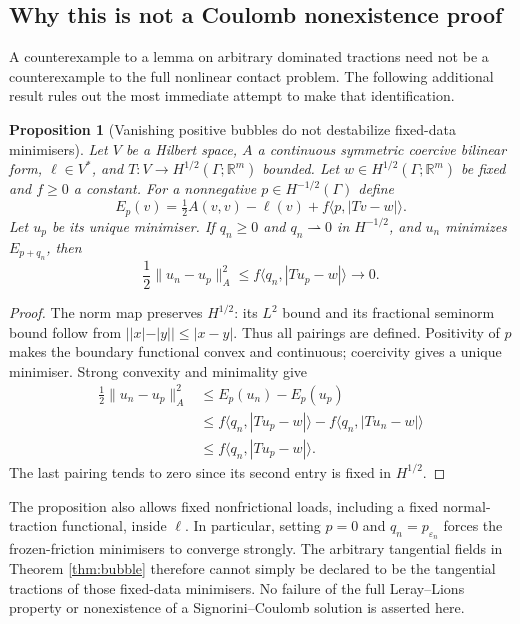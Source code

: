 \documentclass[11pt,a4paper]{article}
\newtheorem{proposition}[theorem]{Proposition}
\theoremstyle{definition}\newtheorem{definition}[theorem]{Definition}
\theoremstyle{remark}\newtheorem{remark}[theorem]{Remark}
\newcommand{\R}{\mathbb R}
\newcommand{\ip}[2]{\langle #1,#2\rangle}
\newcommand{\norm}[1]{\lVert #1\rVert}
\newcommand{\weak}{\rightharpoonup}
\numberwithin{equation}{section}
\begin{document}
\subsection{Why this is not a Coulomb nonexistence proof}\label{sec:nonembedding}
A counterexample to a lemma on arbitrary dominated tractions need not be a counterexample to the full nonlinear contact problem. The following additional result rules out the most immediate attempt to make that identification.

\begin{proposition}[Vanishing positive bubbles do not destabilize fixed-data minimisers]\label{prop:nonembedding}
Let $V$ be a Hilbert space, $A$ a continuous symmetric coercive bilinear form, $\ell\in V^*$, and $T:V\to H^{1/2}(\Gamma;\R^m)$ bounded. Let $w\in H^{1/2}(\Gamma;\R^m)$ be fixed and $f\ge0$ a constant. For a nonnegative $p\in H^{-1/2}(\Gamma)$ define
\[
 E_p(v)=\tfrac12 A(v,v)-\ell(v)+f\ip{p}{|Tv-w|}.
\]
Let $u_p$ be its unique minimiser. If $q_n\ge0$ and $q_n\weak0$ in $H^{-1/2}$, and $u_n$ minimizes $E_{p+q_n}$, then
\begin{equation}\label{eq:nonembedding}
 \frac12\norm{u_n-u_p}_A^2
 \le f\ip{q_n}{|Tu_p-w|}\longrightarrow0.
\end{equation}
\end{proposition}
\begin{proof}
The norm map preserves $H^{1/2}$: its $L^2$ bound and its fractional seminorm bound follow from $||x|-|y||\le|x-y|$. Thus all pairings are defined. Positivity of $p$ makes the boundary functional convex and continuous; coercivity gives a unique minimiser. Strong convexity and minimality give
\begin{align*}
 \tfrac12\norm{u_n-u_p}_A^2
 &\le E_p(u_n)-E_p(u_p)\\
 &\le f\ip{q_n}{|Tu_p-w|}-f\ip{q_n}{|Tu_n-w|}\\
 &\le f\ip{q_n}{|Tu_p-w|}.
\end{align*}
The last pairing tends to zero since its second entry is fixed in $H^{1/2}$.
\end{proof}
The proposition also allows fixed nonfrictional loads, including a fixed normal-traction functional, inside $\ell$. In particular, setting $p=0$ and $q_n=p_{\varepsilon_n}$ forces the frozen-friction minimisers to converge strongly. The arbitrary tangential fields in Theorem \ref{thm:bubble} therefore cannot simply be declared to be the tangential tractions of those fixed-data minimisers. No failure of the full Leray--Lions property or nonexistence of a Signorini--Coulomb solution is asserted here.
\end{document}
